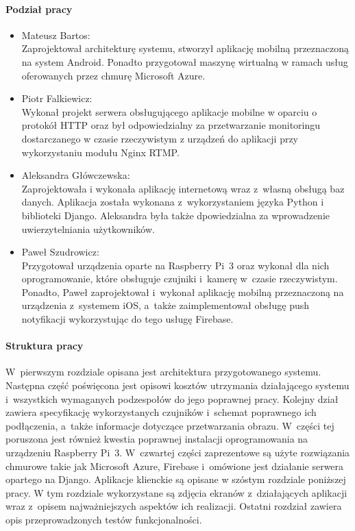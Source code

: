 \paragraph{Podział pracy}
\begin{itemize}
\item Mateusz Bartos: \\
Zaprojektował architekturę systemu, stworzył aplikację mobilną przeznaczoną na system Android. Ponadto przygotował maszynę wirtualną w ramach usług oferowanych przez chmurę Microsoft Azure.
\item Piotr Falkiewicz: \\
Wykonał projekt serwera obsługującego aplikacje mobilne w oparciu o protokół HTTP oraz był odpowiedzialny za przetwarzanie monitoringu dostarczanego w czasie rzeczywistym z urządzeń do aplikacji przy wykorzystaniu modułu Nginx RTMP.
\item Aleksandra Główczewska: \\
Zaprojektowała i wykonała aplikację internetową wraz z~własną obsługą baz danych. Aplikacja została wykonana z~wykorzystaniem języka Python i biblioteki Django. Aleksandra była także dpowiedzialna za wprowadzenie uwierzytelniania użytkowników.
\item Paweł Szudrowicz: \\
Przygotował urządzenia oparte na Raspberry Pi~3 oraz wykonał dla nich oprogramowanie, które obsługuje czujniki i~kamerę w~czasie rzeczywistym. Ponadto, Paweł zaprojektował i~wykonał aplikację mobilną przeznaczoną na urządzenia z~systemem iOS, a~także zaimplementował obsługę push notyfikacji wykorzystując do tego usługę Firebase.
\end{itemize}

\paragraph{Struktura pracy}
W~pierwszym rozdziale opisana jest architektura przygotowanego systemu. Następna część poświęcona jest opisowi kosztów utrzymania działającego systemu i~wszystkich wymaganych podzespołów do jego poprawnej pracy. Kolejny dział zawiera specyfikację wykorzystanych czujników i~schemat poprawnego ich podłączenia, a~także informacje dotyczące przetwarzania obrazu. W~części tej poruszona jest również kwestia poprawnej instalacji oprogramowania na urządzeniu Raspberry Pi~3.  W~czwartej części zaprezentowe są użyte rozwiązania chmurowe takie jak Microsoft Azure, Firebase i~omówione jest działanie serwera opartego na Django. Aplikacje klienckie są opisane w szóstym rozdziale poniższej pracy. W tym rozdziale wykorzystane są zdjęcia ekranów z~działających aplikacji wraz z~opisem najważniejszych aspektów ich realizacji. Ostatni rozdział zawiera opis przeprowadzonych testów funkcjonalności.
